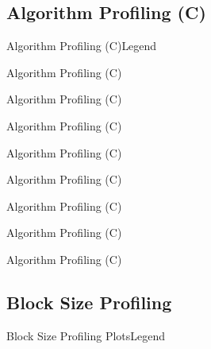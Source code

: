 \subsection{Algorithm Profiling (C)}
\begin{frame}{Algorithm Profiling (C)}{Legend}
\end{frame}
\begin{frame}{Algorithm Profiling (C)}{}
\end{frame}
\begin{frame}{Algorithm Profiling (C)}{}
\end{frame}
\begin{frame}{Algorithm Profiling (C)}{}
\end{frame}
\begin{frame}{Algorithm Profiling (C)}{}
\end{frame}
\begin{frame}{Algorithm Profiling (C)}{}
\end{frame}
\begin{frame}{Algorithm Profiling (C)}{}
\end{frame}
\begin{frame}{Algorithm Profiling (C)}{}
\end{frame}
\begin{frame}{Algorithm Profiling (C)}{}
\end{frame}

\subsection{Block Size Profiling}
\begin{frame}{Block Size Profiling Plots}{Legend}
\end{frame}

